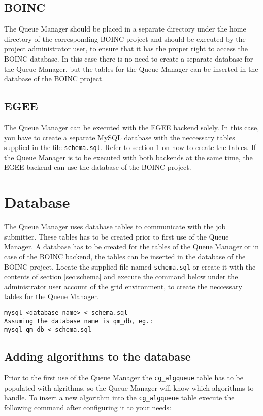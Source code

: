 \documentclass[a4paper, 12pt]{article}
\begin{document}
\subsection{BOINC}
The Queue Manager should be placed in a separate directory under the home directory of the corresponding BOINC project and should be executed by the project administrator user, to ensure that it has the proper right to access the BOINC database. In this case there is no need to create a separate database for the Queue Manager, but the tables for the Queue Manager can be inserted in the database of the BOINC project.

\subsection{EGEE}
The Queue Manager can be executed with the EGEE backend solely. In this case, you have to create a separate MySQL database with the neccessary tables supplied in the file {\tt schema.sql}. Refer to section \ref{sec:db} on how to create the tables. If the Queue Manager is to be executed with both backends at the same time, the EGEE backend can use the database of the BOINC project. 

\section{Database}
\label{sec:db}

The Queue Manager uses database tables to communicate with the job submitter. These tables has to be created prior to first use of the Queue Manager. A database has to be created for the tables of the Queue Manager or in case of the BOINC backend, the tables can be inserted in the database of the BOINC project. Locate the supplied file named {\tt schema.sql} or create it with the contents of section \ref{sec:schema} and execute the command below under the administrator user account of the grid environment, to create the neccessary tables for the Queue Manager.
\begin{verbatim}
mysql <database_name> < schema.sql
Assuming the database name is qm_db, eg.:
mysql qm_db < schema.sql
\end{verbatim}

\subsection{Adding algorithms to the database}

Prior to the first use of the Queue Manager the {\tt cg\_algqueue} table has to be populated with algrithms, so the Queue Manager will know which algorithms to handle. To insert a new algorithm into the {\tt cg\_algqueue} table execute the following command after configuring it to your needs:
\end{document}
